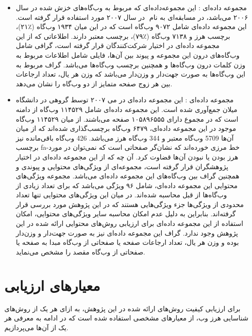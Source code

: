 \documentclass[twoside, a4paper,11pt]{book}
\numberwithin{equation}{chapter}
\numberwithin{table}{chapter}
\numberwithin{figure}{chapter}
\numberwithin{equation}{chapter}
\newcommand{\mls}[1]{\gls{fa-#1}\glsuseri{la-#1}}
\begin{document}
\begin{itemize}
\item
مجموعه داده‌ای : این مجموعه‌داده‌ای که مربوط به وب‌گاه‌های خزش شده در سال ۲۰۰۶ می‌باشد، در مسابقه‌ای به نام ‌ در سال ۲۰۰۷ مورد استفاده قرار گرفته است. این مجموعه داده‌ای شامل ۹۰۷۲ وب‌گاه است که در این میان ۱۹۳۴ وب‌گاه (٪۲۱)، برچسب هرز و ۷۱۳۸ وب‌گاه (٪۷۹)، برچسب معتبر دارند. اطلاعاتی که از این مجموعه داده‌ای در اختیار شرکت‌کنندگان قرار گرفته است، گرافی شامل وب‌گاه‌های درون این مجموعه و پیوند بین آن‌ها، فایلی شامل اطلاعات مربوط به وزن  کلمات درون وب‌گاه‌ها و همچنین برچسب وب‌گاه‌ها می‌باشد. گراف مربوط به این وب‌گاه‌ها به صورت جهت‌دار و وزن‌دار می‌باشد که وزن هر یال، تعداد ارجاعات بین هر زوج صفحه متمایز از دو وب‌گاه را نشان می‌دهد. 
\item
مجموعه داده‌ای : این مجموعه داده‌ای در می ۲۰۰۷ توسط گروهی در دانشگاه میلان \cite{Yahooresearch} جمع‌آوری شده است. این مجموعه داده‌ای شامل ۱۱۴۵۲۹ وب‌گاه از دامنه  است که در مجموع دارای ۱۰۵۸۹۶۵۵۵ صفحه می‌باشند. از میان ۱۱۴۵۲۹ وب‌گاه موجود در این مجموعه داده‌‌ای، ۶۴۷۹ وب‌گاه برچسب‌گذاری شده‌اند که از میان آن‌ها 5709 وب‌گاه معتبر و 344 وب‌گاه هرز می‌باشد. 426 وب‌گاه باقی‌مانده نیز برچسب \mls{خط مرزی} خورده‌اند که نشان‌گر صفحاتی است که نمی‌توان در مورد هرز بودن یا نبودن آن‌ها قضاوت کرد. آن چه که از این مجموعه داده‌ای در اختیار پژوهشگران قرار گرفته است، مجموعه‌ای از ویژگی‌های محتوایی و پیوندی و همچنین گراف بین وب‌گاه‌های این مجموعه داده‌ای می‌باشد. مجموعه ویژگی‌‌های محتوایی این مجموعه داده‌ای، شامل ۹۶ ویژگی می‌باشد که برای تعداد زیادی از وب‌گاه‌ها از قبل محاسبه شده‌اند. در میان این ویژگی‌های محتوایی تنها تعداد محدودی از ویژگی‌‌‌ها جزء ویژگی‌هایی هستند که در این پژوهش مورد بررسی قرار گرفته‌اند. بنابراین به دلیل عدم امکان محاسبه سایر ویژگی‌های محتوایی، امکان استفاده از این مجموعه داده‌ای برای ارزیابی روش‌‌های محتوایی ارائه شده در این پژوهش وجود ندارد.
گراف این مجموعه داده‌ای نیز به صورت جهت‌دار و وزن‌دار بوده و وزن هر یال، تعداد ارجاعات صفحه یا صفحاتی از وب‌گاه مبدا به صفحه یا صفحاتی از وب‌گاه مقصد را مشخص می‌نماید. 
\end{itemize}

\section{معیار‌های ارزیابی}
\label{section:experiments-measures}
برای ارزیابی کیفیت روش‌های ارائه شده در این پژوهش، به ازای هر یک از روش‌های شناسایی هرز وب، از معیار‌های مشخصی استفاده شده‌ است که در ادامه به معرفی هر یک از آن‌ها می‌پردازیم.
\end{document}
